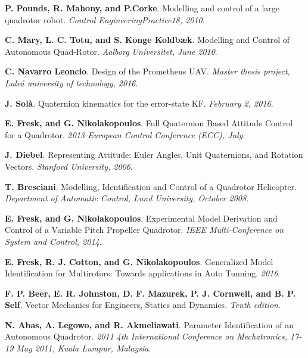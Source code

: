 \documentclass[11pt, a4paper, onecolumn, fleqn, twoside, titlepage, openright]{book}
\begin{document}
	\begin{thebibliography}{1}
	\label{bibliography}

		\textbf{P. Pounds, R. Mahony, and P.Corke}.
		Modelling and control of a large quadrotor robot.
		\textit{Control EngineeringPractice18, 2010}.

		\textbf{C. Mary, L. C. Totu, and S. Konge Koldbæk}.
		Modelling and Control of Autonomous Quad-Rotor.	
		\textit{Aalborg Universitet, June 2010}.

		\textbf{C. Navarro Leoncio}.
		Design of the Prometheus UAV.
		\textit{Master thesis project, Lule\r{a} university of technology, 2016}.

		\textbf{J. Solà}.
		Quaternion kinematics for the error-state KF.
		\textit{February 2, 2016}.

		\textbf{E. Fresk, and G. Nikolakopoulos}.
		Full Quaternion Based Attitude Control for a Quadrotor.
		\textit{2013 European Control Conference (ECC), July}.

		\textbf{J. Diebel}.
		Representing Attitude: Euler Angles, Unit Quaternions, and Rotation Vectors.
		\textit{Stanford University, 2006}.

		\textbf{T. Bresciani}.
		Modelling, Identification and Control of a Quadrotor Helicopter.
		\textit{Department of Automatic Control, Lund University, October 2008}.

		\textbf{E. Fresk, and G. Nikolakopoulos}.
		Experimental Model Derivation and Control of a Variable Pitch Propeller Quadrotor.
		\textit{IEEE Multi-Conference on System and Control, 2014}.

		\textbf{E. Fresk, R. J. Cotton, and G. Nikolakopoulos}.
		Generalized Model Identification for Multirotors: Towards applications in Auto Tunning.
		\textit{2016}.		

		\textbf{F. P. Beer, E. R. Johnston, D. F. Mazurek, P. J. Cornwell, and B. P. Self}.
		Vector Mechanics for Engineers, Statics and Dynamics.
		\textit{Tenth edition}.

		\textbf{N. Abas, A. Legowo, and R. Akmeliawati}.
		Parameter Identification of an Autonomous Quadrotor.
		\textit{2011 4th International Conference on Mechatronics, 17-19 May 2011, Kuala Lumpur, Malaysia}.


\end{thebibliography}
\end{document}
